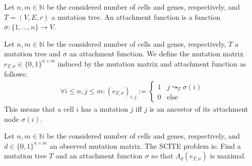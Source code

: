 \begin{definition}
    \label{def:attachment}
    Let $n, m \in \mathbb{N}$ be the considered number of cells and genes, respectively, and $T = (V, E, r)$ a mutation tree. An attachment function is a function $\sigma: \{1, \dots, n\} \rightarrow V$.
\end{definition}

\begin{definition}
    \label{def:induced_mutmatrix}
    Let $n, m \in \mathbb{N}$ be the considered number of cells and genes, respectively, $T$ a mutation tree and $\sigma$ an attachment function. We define the mutation matrix $e_{T, \sigma} \in \{0,1\}^{n \times m}$ induced by the mutation matrix and attachment function as follows:
    \begin{align*}
        \forall i \leq n, j \leq m: (e_{T, \sigma})_{i,j} := \begin{cases}
            1 & j \leadsto_T \sigma(i) \\
            0 & \mathrm{else}
        \end{cases}
    \end{align*}
    This means that a cell $i$ has a mutation $j$ iff $j$ is an ancestor of its attachment node $\sigma(i)$.
\end{definition}


\begin{definition}
    \label{def:scite_problem}
    Let $n, m \in \mathbb{N}$ be the considered number of cells and genes, respectively, and $d \in \{0,1\}^{n \times m}$ an observed mutation matrix. The \ac{SCITE} problem is: Find a mutation tree $T$ and an attachment function $\sigma$ so that $\Lambda_d(e_{T, \sigma})$ is maximal.
\end{definition}

